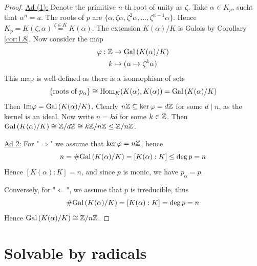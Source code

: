 \documentclass[twoside = false,	%
		headsepline,		%
		parskip = true,
		]{scrbook}						%
\begin{document}
         \begin{proof}
             \underline{Ad (1):}
                Denote the primitive $n$-th root of unity as $\zeta$. Take $\alpha \in K_p$, sucht that $\alpha^n = a$. The roots of $p$ are $\{\alpha, \zeta \alpha, \zeta^2 \alpha, \dots,  \zeta^{n-1} \alpha\}$. Hence $K_p = K(\zeta,\alpha) \overset{\zeta \in K}{=} K(\alpha)$. The extension $K(\alpha)/K$ is Galois by Corollary \ref{cor:1.8}. Now consider the map
                \begin{equation*}
                \begin{split}
                    \varphi: \mathbb Z &\to \mathrm{Gal}\left( K(\alpha)/K\right) \\
                        k &\mapsto (\alpha \mapsto \zeta^k \alpha)
                \end{split}
                \end{equation*}
                This map is well-defined as there is a isomorphism of sets
                \begin{equation*}
                    \{\text{roots of } p_\alpha\} \cong \mathrm{Hom}_K(K(\alpha),K(\alpha)) = \mathrm{Gal}\left( K(\alpha)/K\right)
                \end{equation*}
                Then $\mathrm{Im} \varphi = \mathrm{Gal}\left( K(\alpha)/K\right)$. Clearly $n\mathbb Z \subseteq \ker \varphi = d \mathbb Z$ for some $d \mid n$, as the kernel is an ideal. Now write $n = kd$ for some $k \in \mathbb Z$. Then $\mathrm{Gal}\left( K(\alpha)/K\right) \cong \mathbb Z/d\mathbb Z \cong k\mathbb Z/n\mathbb Z \leq \mathbb Z/n\mathbb Z$.
                
            \underline{Ad 2:}
                For "$\Rightarrow$" we assume that $\ker \varphi = n\mathbb Z$, hence
                \begin{equation*}
                    n = \# \mathrm{Gal}\left( K(\alpha)/K\right) = [K(\alpha):K] \leq \deg p = n
                \end{equation*}
                Hence $[K(\alpha):K] = n$, and since $p$ is monic, we have $p_\alpha = p$.

                Conversely, for "$\Leftarrow$", we assume that $p$ is irreducible, thus
                \begin{equation*}
                    \#\mathrm{Gal}\left( K(\alpha)/K\right) = [K(\alpha):K] = \deg p = n
                \end{equation*}
                Hence $\mathrm{Gal}\left( K(\alpha)/K\right) \cong \mathbb Z/n\mathbb Z$.
         \end{proof}
    
\section{Solvable by radicals}
\end{document}
